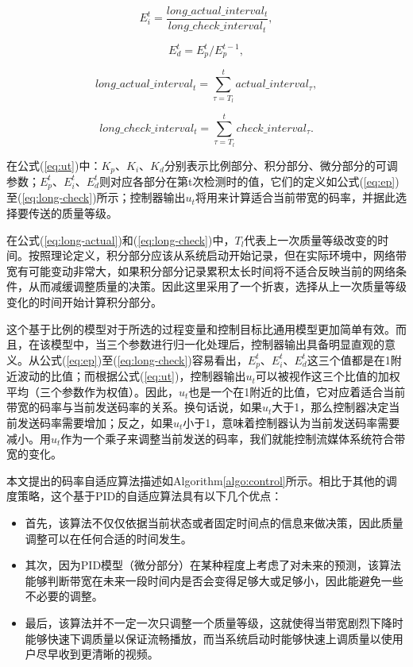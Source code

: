 \begin{equation}
\label{eq:ei}
E_i^t = \frac{{long\_actual\_interva{l_t}}}{{long\_check\_interva{l_t}}} ,
\end{equation}

\begin{equation}
\label{eq:ed}
E_d^t = E_p^t/E_p^{t - 1} ,
\end{equation}

\begin{equation}
\label{eq:long-actual}
long\_actual\_interva{l_t} = \sum\limits_{\tau = {T_l}}^t {actual\_interva{l_\tau}} ,
\end{equation}

\begin{equation}
\label{eq:long-check}
long\_check\_interva{l_t} = \sum\limits_{\tau = {T_l}}^t {check\_interva{l_\tau}} .
\end{equation}

在公式(\ref{eq:ut})中：$K_p$、$K_i$、$K_d$分别表示比例部分、积分部分、微分部分的可调参数；$E_p^t$、$E_i^t$、$E_d^t$则对应各部分在第t次检测时的值，它们的定义如公式(\ref{eq:ep})至(\ref{eq:long-check})所示；控制器输出$u_t$将用来计算适合当前带宽的码率，并据此选择要传送的质量等级。

在公式(\ref{eq:long-actual})和(\ref{eq:long-check})中，$T_l$代表上一次质量等级改变的时间。按照理论定义，积分部分应该从系统启动开始记录，但在实际环境中，网络带宽有可能变动非常大，如果积分部分记录累积太长时间将不适合反映当前的网络条件，从而减缓调整质量的决策。因此这里采用了一个折衷，选择从上一次质量等级变化的时间开始计算积分部分。

这个基于比例的模型对于所选的过程变量和控制目标比通用模型更加简单有效。而且，在该模型中，当三个参数进行归一化处理后，控制器输出具备明显直观的意义。从公式(\ref{eq:ep})至(\ref{eq:long-check})容易看出，$E_p^t$、$E_i^t$、$E_d^t$这三个值都是在1附近波动的比值；而根据公式(\ref{eq:ut})，控制器输出$u_t$可以被视作这三个比值的加权平均（三个参数作为权值）。因此，$u_t$也是一个在1附近的比值，它对应着适合当前带宽的码率与当前发送码率的关系。换句话说，如果$u_t$大于1，那么控制器决定当前发送码率需要增加；反之，如果$u_t$小于1，意味着控制器认为当前发送码率需要减小。用$u_t$作为一个乘子来调整当前发送的码率，我们就能控制流媒体系统符合带宽的变化。

本文提出的码率自适应算法描述如Algorithm\ref{algo:control}所示。相比于其他的调度策略，这个基于PID的自适应算法具有以下几个优点：
\begin{itemize}
	\item 首先，该算法不仅仅依据当前状态或者固定时间点的信息来做决策，因此质量调整可以在任何合适的时间发生。
	\item 其次，因为PID模型（微分部分）在某种程度上考虑了对未来的预测，该算法能够判断带宽在未来一段时间内是否会变得足够大或足够小，因此能避免一些不必要的调整。
	\item 最后，该算法并不一定一次只调整一个质量等级，这就使得当带宽剧烈下降时能够快速下调质量以保证流畅播放，而当系统启动时能够快速上调质量以使用户尽早收到更清晰的视频。
\end{itemize}

